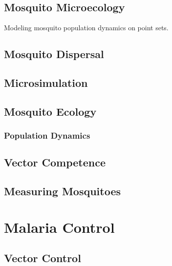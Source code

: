 \documentclass[
]{book}
\begin{document}
\hypertarget{mosquito-microecology}{%
\chapter{Mosquito Microecology}\label{mosquito-microecology}}

Modeling mosquito population dynamics on point sets.

\hypertarget{mosquito-dispersal}{%
\chapter{Mosquito Dispersal}\label{mosquito-dispersal}}

\hypertarget{microsimulation}{%
\chapter{Microsimulation}\label{microsimulation}}

\hypertarget{mosquito-ecology-2}{%
\chapter{Mosquito Ecology}\label{mosquito-ecology-2}}

\hypertarget{population-dynamics}{%
\section{Population Dynamics}\label{population-dynamics}}

\hypertarget{vector-competence}{%
\chapter{Vector Competence}\label{vector-competence}}

\hypertarget{measuring-mosquitoes}{%
\chapter{Measuring Mosquitoes}\label{measuring-mosquitoes}}

\hypertarget{part-malaria-control}{%
\part{Malaria Control}\label{part-malaria-control}}

\hypertarget{vector-control-1}{%
\chapter{Vector Control}\label{vector-control-1}}
\end{document}
